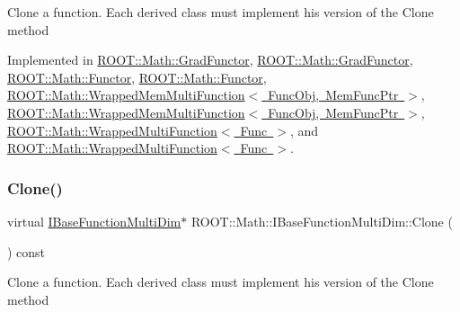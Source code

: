 Clone a function. Each derived class must implement his version of the Clone method 

Implemented in \mbox{\hyperlink{classROOT_1_1Math_1_1GradFunctor_a21093c0d3001069e49ce6278b5a32a40}{R\+O\+O\+T\+::\+Math\+::\+Grad\+Functor}}, \mbox{\hyperlink{classROOT_1_1Math_1_1GradFunctor_a21093c0d3001069e49ce6278b5a32a40}{R\+O\+O\+T\+::\+Math\+::\+Grad\+Functor}}, \mbox{\hyperlink{classROOT_1_1Math_1_1Functor_a989f9b6dd160ebe03911cdee00dacaad}{R\+O\+O\+T\+::\+Math\+::\+Functor}}, \mbox{\hyperlink{classROOT_1_1Math_1_1Functor_a989f9b6dd160ebe03911cdee00dacaad}{R\+O\+O\+T\+::\+Math\+::\+Functor}}, \mbox{\hyperlink{classROOT_1_1Math_1_1WrappedMemMultiFunction_ab9f49fc9a151e8d921dbe9cb148c1fc8}{R\+O\+O\+T\+::\+Math\+::\+Wrapped\+Mem\+Multi\+Function$<$ Func\+Obj, Mem\+Func\+Ptr $>$}}, \mbox{\hyperlink{classROOT_1_1Math_1_1WrappedMemMultiFunction_ab9f49fc9a151e8d921dbe9cb148c1fc8}{R\+O\+O\+T\+::\+Math\+::\+Wrapped\+Mem\+Multi\+Function$<$ Func\+Obj, Mem\+Func\+Ptr $>$}}, \mbox{\hyperlink{classROOT_1_1Math_1_1WrappedMultiFunction_aafa24e359a607b4278f1bf238bdbc336}{R\+O\+O\+T\+::\+Math\+::\+Wrapped\+Multi\+Function$<$ Func $>$}}, and \mbox{\hyperlink{classROOT_1_1Math_1_1WrappedMultiFunction_aafa24e359a607b4278f1bf238bdbc336}{R\+O\+O\+T\+::\+Math\+::\+Wrapped\+Multi\+Function$<$ Func $>$}}.

\mbox{\label{classROOT_1_1Math_1_1IBaseFunctionMultiDim_a57939204b1f525b43835b42e0635dd3b}} 
\subsubsection{\texorpdfstring{Clone()}{Clone()}\hspace{0.1cm}{\footnotesize\ttfamily [2/2]}}
{\footnotesize\ttfamily virtual \mbox{\hyperlink{classROOT_1_1Math_1_1IBaseFunctionMultiDim}{I\+Base\+Function\+Multi\+Dim}}$\ast$ R\+O\+O\+T\+::\+Math\+::\+I\+Base\+Function\+Multi\+Dim\+::\+Clone (\begin{DoxyParamCaption}{ }\end{DoxyParamCaption}) const\hspace{0.3cm}{\ttfamily [pure virtual]}}

Clone a function. Each derived class must implement his version of the Clone method 

